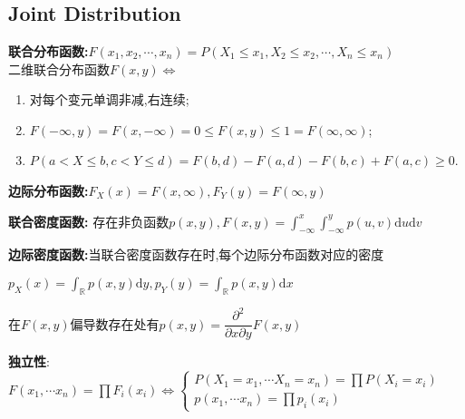 \section{}
\subsection{Joint Distribution}
\textbf{联合分布函数:}$ F(x_1,x_2,\cdots, x_n) = P(X_1\le x_1,X_2\le x_2,\cdots,X_n\le x_n)$
\\

二维联合分布函数$ F(x,y)\Leftrightarrow $
\begin{enumerate}
  \item 对每个变元单调非减,右连续;

  \item $ F(-\infty,y) = F(x,-\infty)= 0\le F(x,y)\le 1= F(\infty,\infty)$;

  \item $ P(a<X\le b, c<Y\le d) = F(b,d)-F(a,d)-F(b,c)+F(a,c)\ge 0$.

\end{enumerate}

\textbf{边际分布函数:}$ F_X(x) = F(x,\infty), F_Y(y) = F(\infty,y)$

\textbf{联合密度函数:} 存在非负函数$ p(x,y), F(x,y) = \int_{-\infty}^x{\int_{-\infty}^y{p(u,v)\mathrm{d}u\mathrm{d}v}}$

\textbf{边际密度函数:}当联合密度函数存在时,每个边际分布函数对应的密度

$ p_X(x) = \int_{\mathbb{R}}p(x,y)\mathrm{d}y,p_Y(y) = \int_{\mathbb{R}}{p(x,y)\mathrm{d}x}$

在$ F(x,y)$偏导数存在处有$ p(x,y) = \dfrac{\partial^2}{\partial x\partial y}F(x,y)$

\textbf{独立性}:$ F(x_1,\cdots x_n)=\prod{F_i(x_i)}\Leftrightarrow \begin{cases} P(X_1=x_1,\cdots X_n=x_n)=\prod{P(X_i=x_i)}\\ p(x_1,\cdots x_n)=\prod{p_i(x_i)}\end{cases}$

